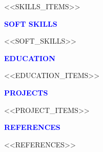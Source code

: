 \documentclass[a4paper,11pt]{letter}
\begin{document}
<<SKILLS_ITEMS>>

\begin{center}
    \vspace{0pt}
    \textcolor{blue}{\MakeUppercase{\textbf{\Large{Soft Skills}}}}
    \vspace{-25pt}
\end{center}
\textcolor{blue}{\hrulefill}
\vspace{-5pt}

<<SOFT_SKILLS>>

\begin{center}
    \vspace{0pt}
    \textcolor{blue}{\MakeUppercase{\textbf{\Large{Education}}}}
    \vspace{-25pt}
\end{center}
\textcolor{blue}{\hrulefill}
\vspace{-10pt}

<<EDUCATION_ITEMS>>

\begin{center}
    \vspace{0pt}
    \textcolor{blue}{\MakeUppercase{\textbf{\Large{Projects}}}}
    \vspace{-25pt}
\end{center}
\textcolor{blue}{\hrulefill}
\vspace{-10pt}

<<PROJECT_ITEMS>>

\begin{center}
    \vspace{0pt}
    \textcolor{blue}{\MakeUppercase{\textbf{\Large{References}}}}
    \vspace{-25pt}
\end{center}
\textcolor{blue}{\hrulefill}
\vspace{-10pt}

<<REFERENCES>>
\end{document}

